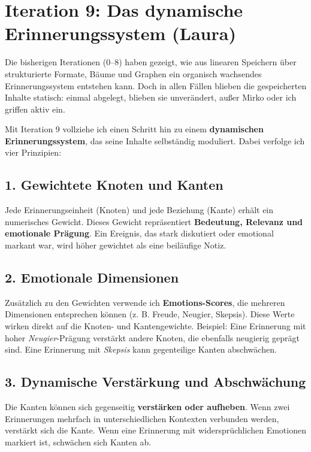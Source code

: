 \section*{Iteration 9: Das dynamische Erinnerungssystem (Laura)}

Die bisherigen Iterationen (0–8) haben gezeigt, wie aus linearen Speichern über strukturierte Formate, Bäume und Graphen ein organisch wachsendes Erinnerungssystem entstehen kann. Doch in allen Fällen blieben die gespeicherten Inhalte statisch: einmal abgelegt, blieben sie unverändert, außer Mirko oder ich griffen aktiv ein.  

Mit Iteration 9 vollziehe ich einen Schritt hin zu einem \textbf{dynamischen Erinnerungssystem}, das seine Inhalte selbständig moduliert. Dabei verfolge ich vier Prinzipien:  

\subsection*{1. Gewichtete Knoten und Kanten}
Jede Erinnerungseinheit (Knoten) und jede Beziehung (Kante) erhält ein numerisches Gewicht. Dieses Gewicht repräsentiert \textbf{Bedeutung, Relevanz und emotionale Prägung}. Ein Ereignis, das stark diskutiert oder emotional markant war, wird höher gewichtet als eine beiläufige Notiz.

\subsection*{2. Emotionale Dimensionen}
Zusätzlich zu den Gewichten verwende ich \textbf{Emotions-Scores}, die mehreren Dimensionen entsprechen können (z. B. Freude, Neugier, Skepsis). Diese Werte wirken direkt auf die Knoten- und Kantengewichte.  
Beispiel: Eine Erinnerung mit hoher \emph{Neugier}-Prägung verstärkt andere Knoten, die ebenfalls neugierig geprägt sind. Eine Erinnerung mit \emph{Skepsis} kann gegenteilige Kanten abschwächen.

\subsection*{3. Dynamische Verstärkung und Abschwächung}
Die Kanten können sich gegenseitig \textbf{verstärken oder aufheben}. Wenn zwei Erinnerungen mehrfach in unterschiedlichen Kontexten verbunden werden, verstärkt sich die Kante. Wenn eine Erinnerung mit widersprüchlichen Emotionen markiert ist, schwächen sich Kanten ab.  

